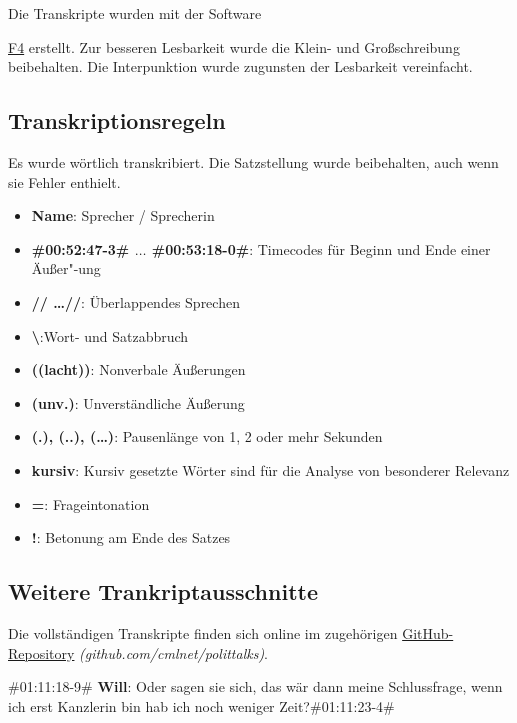 Die Transkripte wurden mit der Software {\href{https://www.audiotranskription.de/}{F4} erstellt. Zur besseren Lesbarkeit wurde die Klein- und Großschreibung beibehalten. Die Interpunktion wurde zugunsten der Lesbarkeit vereinfacht.

\subsection{Transkriptionsregeln}
\label{chap:transkriptionsregeln}

Es wurde wörtlich transkribiert. Die Satzstellung wurde beibehalten, auch wenn sie Fehler enthielt.

\begin{itemize}
	\item \textbf{Name}: Sprecher / Sprecherin
	\item \textbf{\#00:52:47-3\# $\ldots$ \#00:53:18-0\#}: Timecodes für Beginn und Ende einer Äußer"-ung
	\item \textbf{// \ldots //}: Überlappendes Sprechen
	\item \textbf{\textbackslash}:Wort- und Satzabbruch
	\item \textbf{((lacht))}: Nonverbale Äußerungen
	\item \textbf{(unv.)}: Unverständliche Äußerung
	\item \textbf{(.), (..), (\ldots)}: Pausenlänge von 1, 2 oder mehr Sekunden
	\item \textbf{kursiv}: Kursiv gesetzte Wörter sind für die Analyse von besonderer Relevanz
	\item \textbf{=}: Frageintonation
	\item \textbf{!}: Betonung am Ende des Satzes
\end{itemize}

\subsection{Weitere Trankriptausschnitte}

Die vollständigen Transkripte finden sich online im zugehörigen \href{https://github.com/cmlnet/polittalks}{GitHub-Repository} \textit{(github.com/cmlnet/polittalks)}.

\begin{description}
	\begin{linenumbers}
		\item \#01:11:18-9\# \textbf{Will}: Oder sagen sie sich, das wär dann meine Schlussfrage, wenn ich erst Kanzlerin bin hab ich noch weniger Zeit?\#01:11:23-4\# 
		

\end{linenumbers}
\end{description}}
